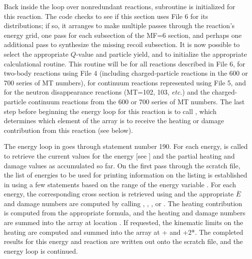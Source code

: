 Back inside the loop over nonredundant reactions, subroutine
 is initialized for this
reaction.  The code checks to see if this section uses File 6
for its distributions; if so, it arranges to make multiple passes
through the reaction's energy grid, one pass for each subsection
of the MF=6 section, and perhaps one additional pass to synthesize
the missing recoil subsection.  It is now possible to select the
appropriate $Q$-value and particle yield, and to initialize the
appropriate calculational routine.  This routine will be
 for all reactions
described in File 6,  for
two-body reactions using File 4 (including charged-particle
reactions in the 600 or 700 series of MT numbers),
 for continuum reactions
represented using File 5, and 
for the neutron disappearance reactions (MT=102, 103, {\it etc.})
and the charged-particle continuum reactions from the 600 or 700
series of MT numbers.  The last step before beginning the energy
loop for this reaction is to call ,
which determines which element of the  array is to receive
the heating or damage contribution from this reaction (see below).

The energy loop in  goes
through statement number 190.  For each energy,
 is called to retrieve the current
values for the energy [see ] and the partial heating
and damage values as accumulated so far.  On the first pass
through the scratch file, the list of energies to be used for
printing information on the listing is established in
 using a few  statements based on the
range of the energy variable .  For each energy, the
corresponding cross section is retrieved using
 and
the appropriate $\overline{E}$ and damage numbers are computed
by calling ,
,
, or
.  The heating contribution
is computed from the appropriate formula, and the heating and damage
numbers are summed into the  array at location .
If requested, the kinematic limits on the heating are computed and
summed into the  array at + and
+2*.  The completed results for this energy and
reaction are written out onto the  scratch file,
and the energy loop is continued.

